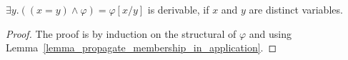 \documentclass[acmsmall]{acmart}
\theoremstyle{acmdefinition}
\newcommand{\imp}{\to}
\newcommand{\CSub}[1]{C_{#1}}
\newcommand{\Csigmaapp}[1]{\CSub{\sigma}[#1]}
\newcommand{\prule}[1]{\textsc{(#1)}}
\newcommand{\framing}{\prule{Framing}\xspace}
\DeclarePairedDelimiter{\ceil}{\lceil}{\rceil}
\begin{document}
\begin{comment}
\begin{lemma}
\label{lemma_definedness_lemma_C}
For any pattern set $\Gamma$,
any symbol $\sigma$,
and any pattern $\varphi$,
$\Gamma \vdash (x = y) \wedge \Csigmaapp{\varphi}
= \Csigmaapp{(x = y) \wedge \varphi }$,
if $x$ and $y$ are distinct, and $x$ does not occur free in $\varphi$.
\end{lemma}
\begin{proof}
Just use Lemma~\ref{lemma_propagate_membership_in_application}.

We first show
$\Gamma \vdash \Csigmaapp{(x = y) \wedge \varphi } \imp (x = y) \wedge 
\Csigmaapp{\varphi}$.
In fact, it follows immediately from \framing and
FOL reasoning.
We now show
$\Gamma \vdash (x = y) \wedge \Csigmaapp{\varphi}
\imp \Csigmaapp{(x = y) \wedge \varphi }$
\todo[inline]{Finish this proof.}
\end{proof}
\end{comment}

\begin{lemma}
\label{lemma_equality_lemma_A}
$\exists y . ((x = y)\wedge \varphi) = \varphi[x/y] $
is derivable,
if $x$ and $y$ are distinct variables.
\end{lemma}
\begin{proof}\quad
The proof is by induction on the structural of $\varphi$
and using Lemma~\ref{lemma_propagate_membership_in_application}.
\end{proof}

\begin{comment}

\begin{lemma}
\label{lemma_definedness_lemma_A}
For any pattern set $\Gamma$ and pattern $\varphi$,
$\Gamma \vdash 
  \ceil{ x \wedge \ceil{y \wedge \varphi}} = \ceil{ y \wedge \varphi }$, 
  where $x$ and $y$ are not necessarily distinct.
\end{lemma}
\begin{proof}
We first prove
$\Gamma \vdash
  \ceil{ y \wedge \varphi } \imp 
  \ceil{ x \wedge \ceil{y \wedge \varphi}}$,
which follows directly from \framing and FOL reasoning,
and the fact that 
$\Gamma \vdash (y \wedge \varphi) \imp \ceil{y \wedge \varphi}$
by Lemma~\ref{lemma_P_implies_ceil_P}.
We now prove
$\Gamma \vdash 
  \ceil{ x \wedge \ceil{y \wedge \varphi}} \imp \ceil{ y \wedge \varphi }$.
\todo[inline]{Finish this proof.}
\end{proof}

\end{comment}
\end{document}
